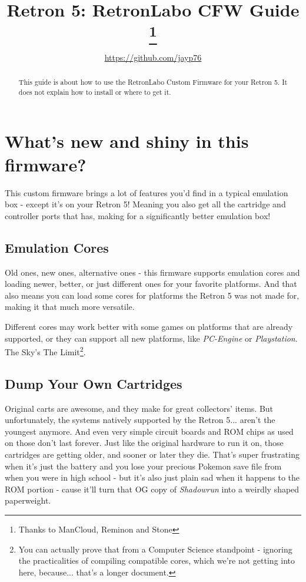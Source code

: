 \documentclass[english]{retronlabo-manual}
\title{Retron 5: RetronLabo CFW Guide
\thanks{Thanks to ManCloud, Reminon and Stone}}
\author{\url{https://github.com/jayp76}}
\begin{document}
\maketitle

\begin{abstract}
This guide is about how to use the RetronLabo Custom Firmware for your Retron 5. It does not explain how to install or where to get it.
\end{abstract}

\FrontMatter

\section{What's new and shiny in this firmware?}

This custom firmware brings a lot of features you'd find in a typical emulation box - except it's on your Retron 5! Meaning you also get all the cartridge and controller ports that has, making for a significantly better emulation box!

\subsection{Emulation Cores}

Old ones, new ones, alternative ones - this firmware supports emulation cores and loading newer, better, or just different ones for your favorite platforms. And that also means you can load some cores for platforms the Retron 5 was not made for, making it that much more versatile.

Different cores may work better with some games on platforms that are already supported, or they can support all new platforms, like \emph{PC-Engine} or \emph{Playstation}. The Sky's The Limit\footnote{You can actually prove that from a Computer Science standpoint - ignoring the practicalities of compiling compatible cores, which we're not getting into here, because... that's a longer document.}.

\subsection{Dump Your Own Cartridges}

Original carts are awesome, and they make for great collectors' items. But unfortunately, the systems natively supported by the Retron 5... aren't the youngest anymore. And even very simple circuit boards and ROM chips as used on those don't last forever. Just like the original hardware to run it on, those cartridges are getting older, and sooner or later they die. That's super frustrating when it's just the battery and you lose your precious Pokemon save file from when you were in high school - but it's also just plain sad when it happens to the ROM portion - cause it'll turn that OG copy of \emph{Shadowrun} into a weirdly shaped paperweight.
\end{document}
